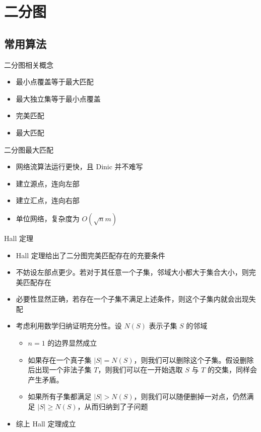 ﻿\documentclass[aspectratio=169]{ctexbeamer}
\begin{document}
\section{二分图}

\subsection{常用算法}
\begin{frame}{二分图相关概念}
    \begin{itemize}
        \item 最小点覆盖等于最大匹配
        \item 最大独立集等于最小点覆盖
        \item 完美匹配
        \item 最大匹配
    \end{itemize}
\end{frame}

\begin{frame}{二分图最大匹配}
    \begin{itemize}
        \item 网络流算法运行更快，且 Dinic 并不难写
        \item 建立源点，连向左部
        \item 建立汇点，连向右部
        \item 单位网络，复杂度为 $O(\sqrt{n}m)$
    \end{itemize}
\end{frame}

\begin{frame}{Hall 定理}
    \begin{itemize}
        \item Hall 定理给出了二分图完美匹配存在的充要条件
        \item 不妨设左部点更少。若对于其任意一个子集，邻域大小都大于集合大小，则完美匹配存在
        \item 必要性显然正确，若存在一个子集不满足上述条件，则这个子集内就会出现失配
        \item 考虑利用数学归纳证明充分性。设 $N(S)$ 表示子集 $S$ 的邻域
        \begin{itemize}
            \item $n=1$ 的边界显然成立
            \item 如果存在一个真子集 $|S|=N(S)$，则我们可以删除这个子集。假设删除后出现一个非法子集 $T$，则我们可以在一开始选取 $S$ 与 $T$ 的交集，同样会产生矛盾。
            \item 如果所有子集都满足 $|S|> N(S)$，则我们可以随便删掉一对点，仍然满足 $|S|\ge N(S)$，从而归纳到了子问题
        \end{itemize}
        \item 综上 Hall 定理成立
    \end{itemize}
\end{frame}
\end{document}
